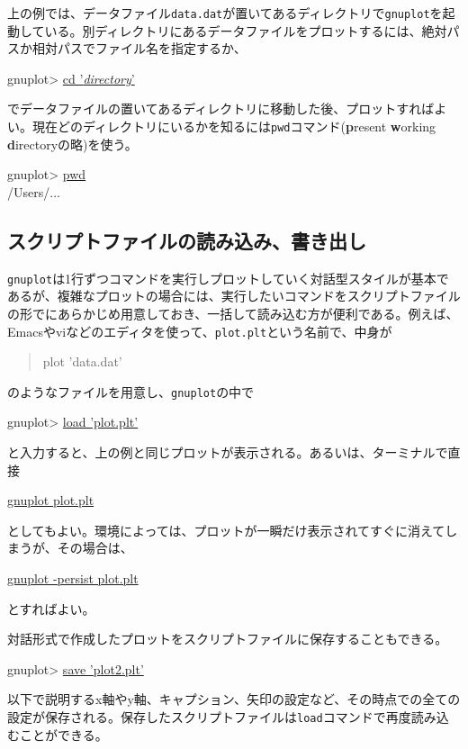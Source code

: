 {上の例では、データファイル{\tt data.dat}が置いてあるディレクトリで{\tt gnuplot}を起動している。別ディレクトリにあるデータファイルをプロットするには、絶対パスか相対パスでファイル名を指定するか、
\begin{commandline2}
gnuplot> \underline{cd '{\it directory}'}
\end{commandline2} \noindent
でデータファイルの置いてあるディレクトリに移動した後、プロットすればよい。現在どのディレクトリにいるかを知るには{\tt pwd}コマンド({\bf p}resent {\bf w}orking {\bf d}irectoryの略)を使う。
\begin{commandline2}
gnuplot> \underline{pwd}\\
/Users/...  
\end{commandline2} \noindent

\subsection{スクリプトファイルの読み込み、書き出し}

{\tt gnuplot}は1行ずつコマンドを実行しプロットしていく対話型スタイルが基本であるが、複雑なプロットの場合には、実行したいコマンドをスクリプトファイルの形でにあらかじめ用意しておき、一括して読み込む方が便利である。例えば、Emacsやviなどのエディタを使って、{\tt plot.plt}という名前で、中身が
\begin{quote}
plot 'data.dat'
\end{quote}
のようなファイルを用意し、{\tt gnuplot}の中で
\begin{commandline2}
gnuplot> \underline{load 'plot.plt'}
\end{commandline2} \noindent
と入力すると、上の例と同じプロットが表示される。あるいは、ターミナルで直接
\begin{commandline2}
\prompt \underline{gnuplot plot.plt}
\end{commandline2} \noindent
としてもよい。環境によっては、プロットが一瞬だけ表示されてすぐに消えてしまうが、その場合は、
\begin{commandline2}
\prompt \underline{gnuplot -persist plot.plt}
\end{commandline2} \noindent
とすればよい。

対話形式で作成したプロットをスクリプトファイルに保存することもできる。
\begin{commandline2}
gnuplot> \underline{save 'plot2.plt'}
\end{commandline2} \noindent
以下で説明するx軸やy軸、キャプション、矢印の設定など、その時点での全ての設定が保存される。保存したスクリプトファイルは{\tt load}コマンドで再度読み込むことができる。

}
